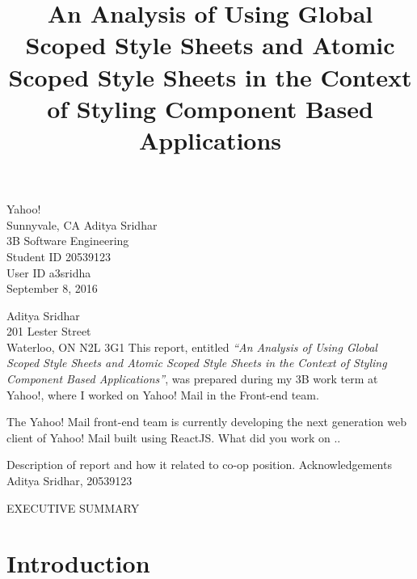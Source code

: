\documentclass[12pt]{article}
\begin{document}


\title{An Analysis of Using Global Scoped Style Sheets and Atomic Scoped Style Sheets in the Context of Styling Component Based Applications}
{
	Yahoo!\\
	Sunnyvale, CA
}
{
	Aditya Sridhar\\
	3B Software Engineering\\
	Student ID 20539123\\
	User ID a3sridha\\
	September 8, 2016
}


{
	\noindent
	Aditya Sridhar\\
	201 Lester Street\\
	Waterloo, ON N2L 3G1
}
{
	This report, entitled \textit{“An Analysis of Using Global Scoped Style Sheets and Atomic Scoped Style Sheets in the Context of Styling Component Based Applications”}, was prepared during my 3B work term at Yahoo!, where I worked on Yahoo! Mail in the Front-end team.
}
{
	The Yahoo! Mail front-end team is currently developing the next generation web client of Yahoo! Mail built using ReactJS. What did you work on .. 

}
{
	Description of report and how it related to co-op position.
}
{
	Acknowledgements
}
{
	Aditya Sridhar, 20539123
}


EXECUTIVE SUMMARY
\newpage




\toc


\section{Introduction}
\end{document}
